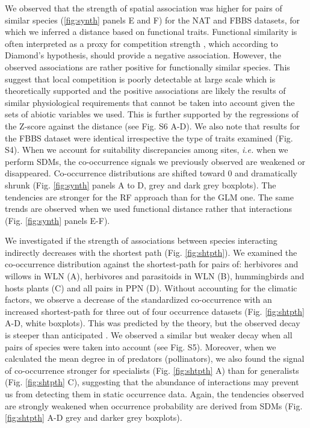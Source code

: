 We observed that the strength of spatial association was higher for
pairs of similar species (\ref{fig:synth} panels E and F) for the NAT
and FBBS datasets, for which we inferred a distance based on functional
traits. Functional similarity is often interpreted as a proxy for
competition strength \citep{Morales-Castilla2015}, which according to
Diamond's hypothesis, should provide a negative association. However,
the observed associations are rather positive for functionally similar
species. This suggest that local competition is poorly detectable at
large scale which is theoretically supported \citep{Araujo2014} and the
positive associations are likely the results of similar physiological
requirements that cannot be taken into account given the sets of abiotic
variables we used. This is further supported by the regressions of the
Z-score against the distance (see Fig. S6 A-D). We also note that
results for the FBBS dataset were identical irrespective the type of
traits examined (Fig. S4). When we account for suitability discrepancies
among sites, \emph{i.e.} when we perform SDMs, the co-occurrence signals
we previously observed are weakened or disappeared. Co-occurrence
distributions are shifted toward 0 and dramatically shrunk (Fig.
\ref{fig:synth} panels A to D, grey and dark grey boxplots). The
tendencies are stronger for the RF approach than for the GLM one. The
same trends are observed when we used functional distance rather that
interactions (Fig. \ref{fig:synth} panels E-F).

We investigated if the strength of associations between species
interacting indirectly decreases with the shortest path (Fig.
\ref{fig:shtpth}). We examined the co-occurrence distribution against
the shortest-path for pairs of: herbivores and willows in WLN (A),
herbivores and parasitoids in WLN (B), hummingbirds and hosts plants (C)
and all pairs in PPN (D). Without accounting for the climatic factors,
we observe a decrease of the standardized co-occurrence with an
increased shortest-path for three out of four occurrence datasets (Fig.
\ref{fig:shtpth} A-D, white boxplots). This was predicted by the theory,
but the observed decay is steeper than anticipated \citep{Cazelles2016}.
We observed a similar but weaker decay when all pairs of species were
taken into account (see Fig. S5). Moreover, when we calculated the mean
degree in of predators (pollinators), we also found the signal of
co-occurrence stronger for specialists (Fig. \ref{fig:shtpth} A) than
for generalists (Fig. \ref{fig:shtpth} C), suggesting that the abundance
of interactions may prevent us from detecting them in static occurrence
data. Again, the tendencies observed are strongly weakened when
occurrence probability are derived from SDMs (Fig. \ref{fig:shtpth} A-D
grey and darker grey boxplots).

